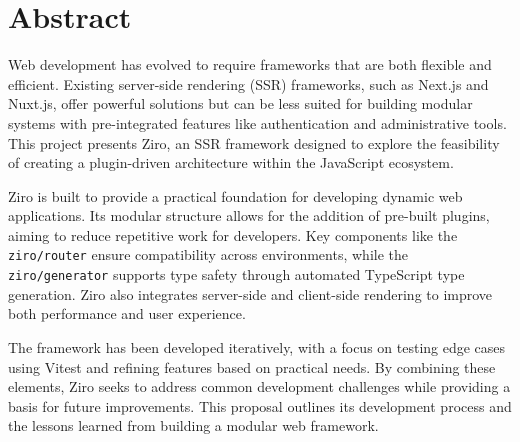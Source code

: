 \section{Abstract}

Web development has evolved to require frameworks that are both flexible and efficient. Existing server-side rendering (SSR) frameworks, such as Next.js and Nuxt.js, offer powerful solutions but can be less suited for building modular systems with pre-integrated features like authentication and administrative tools. This project presents Ziro, an SSR framework designed to explore the feasibility of creating a plugin-driven architecture within the JavaScript ecosystem.

Ziro is built to provide a practical foundation for developing dynamic web applications. Its modular structure allows for the addition of pre-built plugins, aiming to reduce repetitive work for developers. Key components like the \texttt{ziro/router} ensure compatibility across environments, while the \texttt{ziro/generator} supports type safety through automated TypeScript type generation. Ziro also integrates server-side and client-side rendering to improve both performance and user experience.

The framework has been developed iteratively, with a focus on testing edge cases using Vitest and refining features based on practical needs. By combining these elements, Ziro seeks to address common development challenges while providing a basis for future improvements. This proposal outlines its development process and the lessons learned from building a modular web framework.
\\
\\
\\
\\


\pagebreak

